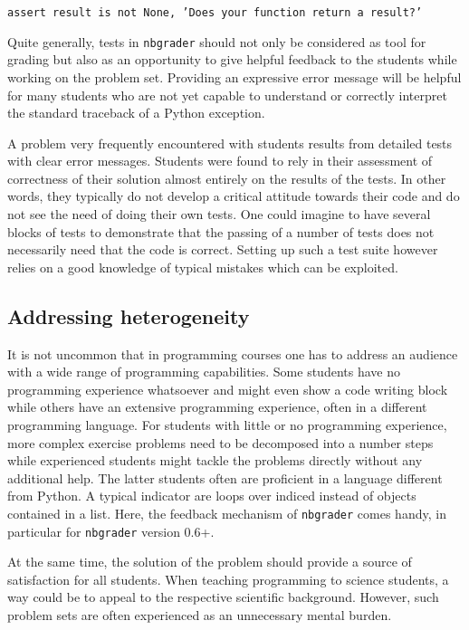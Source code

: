 \documentclass[twocolumn]{svjour3}          %
\begin{document}
\noindent\texttt{assert result is not None, 'Does your function return
a result?'}

Quite generally, tests in \texttt{nbgrader} should not only be considered as
tool for grading but also as an opportunity to give helpful feedback to the
students while working on the problem set. Providing an expressive error
message will be helpful for many students who are not yet capable to understand
or correctly interpret the standard traceback of a Python exception. 

A problem very frequently encountered with students results from detailed 
tests with clear error messages. Students were found to rely in their assessment
of correctness of their solution almost entirely on the results of the tests.
In other words, they typically do not develop a critical attitude towards their
code and do not see the need of doing their own tests. One could imagine to
have several blocks of tests to demonstrate that the passing of a number of
tests does not necessarily need that the code is correct. Setting up such a
test suite however relies on a good knowledge of typical mistakes which can
be exploited.

\subsection{Addressing heterogeneity}

It is not uncommon that in programming courses one has to address an audience
with a wide range of programming capabilities. Some students have no
programming experience whatsoever and might even show a code writing block
while others have an extensive programming experience, often in a different
programming language. For students with little or no programming experience,
more complex exercise problems need to be decomposed into a number steps while
experienced students might tackle the problems directly without any additional
help. The latter students often are proficient in a language different from
Python. A typical indicator are loops over indiced instead of objects contained
in a list. Here, the feedback mechanism of \texttt{nbgrader} comes handy, in
particular for \texttt{nbgrader} version 0.6+.

At the same time, the solution of the problem should provide a source of
satisfaction for all students. When teaching programming to science students, a
way could be to appeal to the respective scientific background. However, such
problem sets are often experienced as an unnecessary mental burden.
\end{document}
